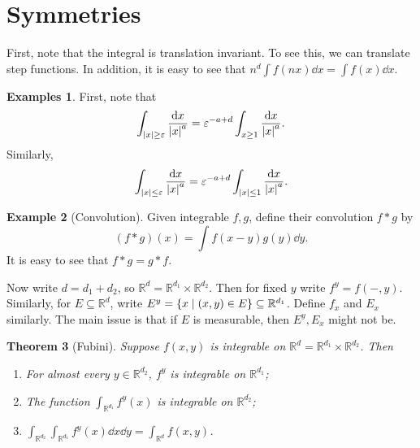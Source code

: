 \documentclass[leqno, openany]{memoir}
\newtheorem{thm}{Theorem}[chapter]
\theoremstyle{definition}
\newtheorem{exm}[thm]{Example}
\newtheorem{exms}[thm]{Examples}
\theoremstyle{remark}
\theoremstyle{plain}
\theoremstyle{definition}
\theoremstyle{remark}
\newcommand{\R}{\mathbb{R}}
\newcommand{\ep}{\varepsilon}
\begin{document}
\section{Symmetries}%

First, note that the integral is translation invariant. To see this, we can
translate step functions. In addition, it is easy to see that $n^d \int f(nx)
\dd{x} = \int f(x) \dd{x}$.

\begin{exms} First, note that \[ \int_{\abs{x} \geq \ep}
    \frac{\dd{x}}{\abs{x}^a} = \ep^{-a+d} \int_{x \geq 1}
    \frac{\dd{x}}{\abs{x}^a}. \] Similarly, \[ \int_{\abs{x} \leq \ep}
\frac{\dd{x}}{\abs{x}^a} = \ep^{-a+d} \int_{\abs{x} \leq 1}
\frac{\dd{x}}{\abs{x}^a}. \] \end{exms}

\begin{exm}[Convolution] Given integrable $f,g$, define their convolution $f *
    g$ by \[ (f * g)(x) = \int f(x-y)g(y) \dd{y}. \] It is easy to see that $f
* g = g * f$.  \end{exm}

Now write $d = d_1 + d_2$, so $\R^d = \R^{d_1} \times \R^{d_2}$. Then for fixed
$y$ write $f^y = f(-,y)$. Similarly, for $E \subseteq \R^d$, write $E^y =
\qty{x \mid (x,y) \in E} \subseteq \R^{d_1}$. Define $f_x$ and $E_x$ similarly.
The main issue is that if $E$ is measurable, then $E^y, E_x$ might not be.

\begin{thm}[Fubini] Suppose $f(x,y)$ is integrable on $\R^d = \R^{d_1} \times
    \R^{d_2}$. Then \begin{enumerate} \item For almost every $y \in \R^{d_2}$,
        $f^y$ is integrable on $\R^{d_1}$; \item The function $\int_{\R^{d_1}}
        f^y(x)$ is integrable on $\R^{d_2}$; \item $\int_{\R^{d_2}}
\int_{\R^{d_1}} f^y(x) \dd{x} \dd{y} = \int_{\R^d} f(x,y)$.  \end{enumerate}
\end{thm}
\end{document}
